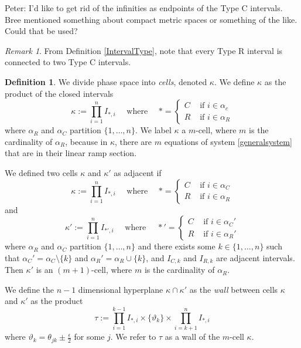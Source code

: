 \documentclass[12pt]{article}
\theoremstyle{definition}
\newtheorem{defn}{Definition}[section]
\theoremstyle{remark}
\newtheorem*{remark}{Remark}
\begin{document}
{\color{cyan} Peter: I'd like to get rid of the infinities as endpoints of the Type C intervals. Bree mentioned something about compact metric spaces or something of the like. Could that be used?}

\begin{remark}
From Definition \ref{IntervalType}, note that every Type R interval is connected to two Type C intervals.
\end{remark}

\begin{defn} \label{kappa}
 We divide phase space into \textit{cells}, denoted $\kappa$. We define $\kappa$ as the product of the closed intervals
 \begin{equation}	\label{kappadefn}
 \kappa:=\prod_{i=1}^n I_{*,i} \quad \text{ where } \quad *=
 \begin{cases} 
 C & \text { if } i\in\alpha_c \\
 R & \text{ if } i \in \alpha_R
 \end{cases}
 \end{equation}
 where $\alpha_R$ and $\alpha_C$ partition $\{1,\dots,n\}$. We label $\kappa$ a  $m$-cell, where $m$ is the cardinality of $\alpha_R$, because in $\kappa$, there are $m$ equations of system \eqref{generalsystem} that are in their linear ramp section.

We defined two cells $\kappa$ and $\kappa'$ as adjacent if 
\begin{equation*}
\kappa:=\prod_{i=1}^n I_{*,i} \quad \text{ where } \quad *=
 \begin{cases} 
 C & \text { if } i\in\alpha_C \\
 R & \text{ if } i \in \alpha_R
 \end{cases}
 \end{equation*}
 and 
 \begin{equation*}
\kappa':=\prod_{i=1}^n I_{*',i} \quad \text{ where } \quad *'=
 \begin{cases} 
 C & \text { if } i\in\alpha_C' \\
 R & \text{ if } i \in \alpha_R'
 \end{cases}
 \end{equation*}
 where $\alpha_R$ and $\alpha_C$ partition $\{1,\dots,n\}$ and there exists some $k\in \{1,\dots,n\}$ such that $\alpha_C'=\alpha_C\setminus \{k\}$ and $\alpha_R'=\alpha_R\cup \{k\}$, and $I_{C,k}$ and $I_{R,k}$ are adjacent intervals. Then $\kappa'$ is an $(m+1)$-cell, where $m$ is the cardinality of $\alpha_R$.
 
We define the $n-1$ dimensional hyperplane $\kappa \cap \kappa'$ as the \textit{wall} between cells $\kappa$ and $\kappa'$ as the product
\begin{equation*}
\tau:=\prod_{i=1}^{k-1} I_{*,i} \times \{\vartheta_k\} \times \prod_{i=k+1}^{n} I_{*,i}
\end{equation*}
where $\vartheta_k = \theta_{jk} \pm \frac{\epsilon}{2}$ for some $j$. We refer to $\tau$ as a wall of the $m$-cell $\kappa$.
\end{defn}
\end{document}
